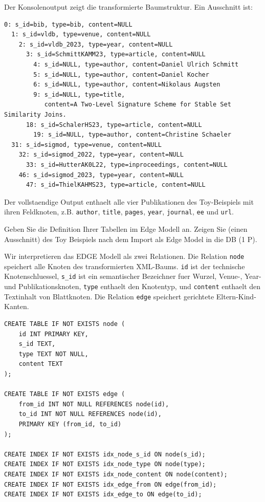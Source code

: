\documentclass[11pt]{scrartcl}
\begin{document}
Der Konsolenoutput zeigt die transformierte Baumstruktur. Ein Ausschnitt ist:

\begin{lstlisting}
0: s_id=bib, type=bib, content=NULL
  1: s_id=vldb, type=venue, content=NULL
    2: s_id=vldb_2023, type=year, content=NULL
      3: s_id=SchmittKAMM23, type=article, content=NULL
        4: s_id=NULL, type=author, content=Daniel Ulrich Schmitt
        5: s_id=NULL, type=author, content=Daniel Kocher
        6: s_id=NULL, type=author, content=Nikolaus Augsten
        9: s_id=NULL, type=title,
           content=A Two-Level Signature Scheme for Stable Set Similarity Joins.
      18: s_id=SchalerHS23, type=article, content=NULL
        19: s_id=NULL, type=author, content=Christine Schaeler
  31: s_id=sigmod, type=venue, content=NULL
    32: s_id=sigmod_2022, type=year, content=NULL
      33: s_id=HutterAK0L22, type=inproceedings, content=NULL
    46: s_id=sigmod_2023, type=year, content=NULL
      47: s_id=ThielKAHMS23, type=article, content=NULL
\end{lstlisting}

Der vollstaendige Output enthaelt alle vier Publikationen des Toy-Beispiels mit ihren Feldknoten, z.B. \texttt{author}, \texttt{title}, \texttt{pages}, \texttt{year}, \texttt{journal}, \texttt{ee} und \texttt{url}.

Geben Sie die Definition Ihrer Tabellen im Edge Modell an. Zeigen Sie (einen Ausschnitt) des Toy Beispiels nach dem Import als Edge Model in die DB (1 P).

Wir interpretieren das EDGE Modell als zwei Relationen. Die Relation \texttt{node} speichert alle Knoten des transformierten XML-Baums. \texttt{id} ist der technische Knotenschluessel, \texttt{s\_id} ist ein semantischer Bezeichner fuer Wurzel, Venue-, Year- und Publikationsknoten, \texttt{type} enthaelt den Knotentyp, und \texttt{content} enthaelt den Textinhalt von Blattknoten. Die Relation \texttt{edge} speichert gerichtete Eltern-Kind-Kanten.

\begin{lstlisting}[style=dmrsql]
CREATE TABLE IF NOT EXISTS node (
    id INT PRIMARY KEY,
    s_id TEXT,
    type TEXT NOT NULL,
    content TEXT
);

CREATE TABLE IF NOT EXISTS edge (
    from_id INT NOT NULL REFERENCES node(id),
    to_id INT NOT NULL REFERENCES node(id),
    PRIMARY KEY (from_id, to_id)
);

CREATE INDEX IF NOT EXISTS idx_node_s_id ON node(s_id);
CREATE INDEX IF NOT EXISTS idx_node_type ON node(type);
CREATE INDEX IF NOT EXISTS idx_node_content ON node(content);
CREATE INDEX IF NOT EXISTS idx_edge_from ON edge(from_id);
CREATE INDEX IF NOT EXISTS idx_edge_to ON edge(to_id);
\end{lstlisting}
\end{document}
